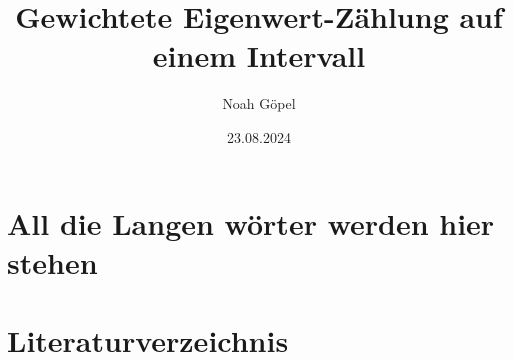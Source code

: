 \documentclass[ngerman,BCOR=4mm]{tudscrreprt}
\theoremstyle{plain} %
\theoremstyle{definition} %
\theoremstyle{remark}
\begin{document}

\date{23.08.2024}
\title{%
      Gewichtete Eigenwert-Zählung auf einem Intervall
}
\subject{bachelor}
\author{%
      Noah Göpel%
}
\maketitle

\clearpage
\tableofcontents
\clearpage
\listofsymbols


\chapter{All die Langen wörter werden hier stehen} \label{sec: lange wörter}

\chapter{Literaturverzeichnis}
\printbibliography
\end{document}
